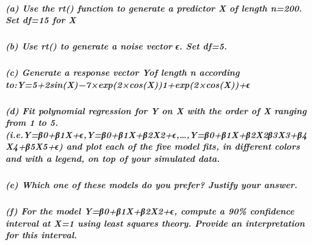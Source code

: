 \documentclass[
]{article}
\begin{document}
\hypertarget{a-use-the-rt-function-to-generate-a-predictor-x-of-length-n200.-set-df15-for-x}{%
\subparagraph{(a) Use the rt() function to generate a predictor X of
length n=200. Set df=15 for
X}\label{a-use-the-rt-function-to-generate-a-predictor-x-of-length-n200.-set-df15-for-x}}

\hypertarget{b-use-rt-to-generate-a-noise-vector-ux3f5.-set-df5.}{%
\subparagraph{(b) Use rt() to generate a noise vector ϵ. Set
df=5.}\label{b-use-rt-to-generate-a-noise-vector-ux3f5.-set-df5.}}

\hypertarget{c-generate-a-response-vector-yof-length-n-according-toy52sinx7exp2cosx1exp2cosxux3f5}{%
\subparagraph{(c) Generate a response vector Yof length n according
to:Y=5+2sin(X)−7×exp(2×cos(X))1+exp(2×cos(X))+ϵ}\label{c-generate-a-response-vector-yof-length-n-according-toy52sinx7exp2cosx1exp2cosxux3f5}}

\hypertarget{d-fit-polynomial-regression-for-y-on-x-with-the-order-of-x-ranging-from-1-to-5.-i.e.yux3b20ux3b21xux3f5yux3b20ux3b21xux3b22x2ux3f5yux3b20ux3b21xux3b22x2ux3b23x3ux3b24x4ux3b25x5ux3f5-and-plot-each-of-the-five-model-fits-in-different-colors-and-with-a-legend-on-top-of-your-simulated-data.}{%
\subparagraph{(d) Fit polynomial regression for Y on X with the order of
X ranging from 1 to 5.
(i.e.Y=β0+β1X+ϵ,Y=β0+β1X+β2X2+ϵ,\ldots,Y=β0+β1X+β2X2β3X3+β4X4+β5X5+ϵ)
and plot each of the five model fits, in different colors and with a
legend, on top of your simulated
data.}\label{d-fit-polynomial-regression-for-y-on-x-with-the-order-of-x-ranging-from-1-to-5.-i.e.yux3b20ux3b21xux3f5yux3b20ux3b21xux3b22x2ux3f5yux3b20ux3b21xux3b22x2ux3b23x3ux3b24x4ux3b25x5ux3f5-and-plot-each-of-the-five-model-fits-in-different-colors-and-with-a-legend-on-top-of-your-simulated-data.}}

\hypertarget{e-which-one-of-these-models-do-you-prefer-justify-your-answer.}{%
\subparagraph{(e) Which one of these models do you prefer? Justify your
answer.}\label{e-which-one-of-these-models-do-you-prefer-justify-your-answer.}}

\hypertarget{f-for-the-model-yux3b20ux3b21xux3b22x2ux3f5-compute-a-90-confidence-interval-at-x1-using-least-squares-theory.-provide-an-interpretation-for-this-interval.}{%
\subparagraph{(f) For the model Y=β0+β1X+β2X2+ϵ, compute a 90\%
confidence interval at X=1 using least squares theory. Provide an
interpretation for this
interval.}\label{f-for-the-model-yux3b20ux3b21xux3b22x2ux3f5-compute-a-90-confidence-interval-at-x1-using-least-squares-theory.-provide-an-interpretation-for-this-interval.}}
\end{document}
